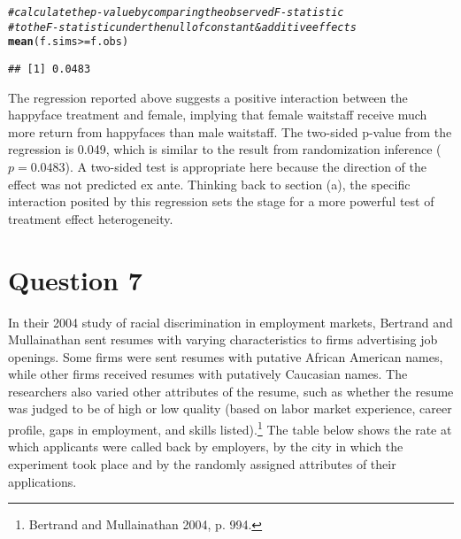 \documentclass[11pt,notitlepage]{article}\usepackage[]{graphicx}\usepackage[]{color}
\makeatletter
\newcommand{\hlcom}[1]{\textcolor[rgb]{0.678,0.584,0.686}{\textit{#1}}}%
\newcommand{\hlopt}[1]{\textcolor[rgb]{0,0,0}{#1}}%
\newcommand{\hlstd}[1]{\textcolor[rgb]{0.345,0.345,0.345}{#1}}%
\newcommand{\hlkwd}[1]{\textcolor[rgb]{0.737,0.353,0.396}{\textbf{#1}}}%
\newenvironment{kframe}{%
 \def\at@end@of@kframe{}%
 \ifinner\ifhmode%
  \def\at@end@of@kframe{\end{minipage}}%
  \begin{minipage}{\columnwidth}%
 \fi\fi%
 \def\FrameCommand##1{\hskip\@totalleftmargin \hskip-\fboxsep
 \colorbox{shadecolor}{##1}\hskip-\fboxsep
     \hskip-\linewidth \hskip-\@totalleftmargin \hskip\columnwidth}%
 \MakeFramed {\advance\hsize-\width
   \@totalleftmargin\z@ \linewidth\hsize
   \@setminipage}}%
 {\par\unskip\endMakeFramed%
 \at@end@of@kframe}
\newenvironment{knitrout}{}{} %
\makeatother
\begin{document}
\begin{enumerate}[a)]
\begin{knitrout}
\begin{kframe}
\begin{alltt}
\hlcom{# calculate the p-value by comparing the observed F-statistic }
\hlcom{# to the F-statistic under the null of constant & additive effects}
\hlkwd{mean}\hlstd{(f.sims} \hlopt{>=} \hlstd{f.obs)}
\end{alltt}
\begin{verbatim}
## [1] 0.0483
\end{verbatim}
\end{kframe}
\end{knitrout}
\end{enumerate}

The regression reported above suggests a positive interaction between the happyface treatment and female, implying that female waitstaff receive much more return from happyfaces than male waitstaff. The two-sided p-value from the regression is 0.049, which is similar to the result from randomization inference ($p=0.0483$).  A two-sided test is appropriate here because the direction of the effect was not predicted ex ante.  Thinking back to section (a), the specific interaction posited by this regression sets the stage for a more powerful test of treatment effect heterogeneity.

\section*{Question 7}
In their 2004 study of racial discrimination in employment markets, Bertrand and Mullainathan sent resumes with varying characteristics to firms advertising job openings. Some firms were sent resumes with putative African American names, while other firms received resumes with putatively Caucasian names. The researchers also varied other attributes of the resume, such as whether the resume was judged to be of high or low quality (based on labor market experience, career profile, gaps in employment, and skills listed).\footnote{Bertrand and Mullainathan 2004, p. 994.} The table below shows the rate at which applicants were called back by employers, by the city in which the experiment took place and by the randomly assigned attributes of their applications.
\end{document}
